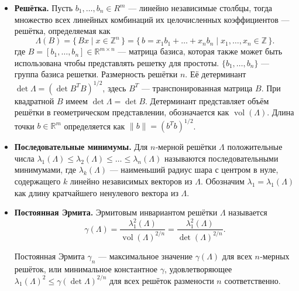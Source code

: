 \begin{itemize}
\item \textbf{Решётка.} Пусть $b_{1},\ldots,b_{n}\in R^{m}$ — линейно
        независимые столбцы, тогда множество всех линейных комбинаций их
        целочисленных коэффициентов — решётка, определяемая как
        \begin{equation} \Lambda(B) =\{\,Bx \mid x\in \mathbb{Z}^{n}\,\} =\{\,b
            = x_{1}b_{1}+\dots+x_{n}b_{n} \mid x_{1},\dots,x_{n}\in
        \mathbb{Z}\,\}. \end{equation}
        где $B=[b_{1},\ldots,b_{n}]\in \mathbb{R}^{m\times n}$ --- матрица
        базиса, которая также может быть использована чтобы представлять
        решетку для простоты. $\{b_1, \ldots, b_n\}$ --- группа базиса решетки.
        Размерность решётки $n$. Её детерминант $\det\Lambda=(\det
        B^{T}B)^{1/2}$, здесь $B^T$ --- транспонированная матрица $B$. При
        квадратной $B$ имеем $\det\Lambda=\det B$. Детерминант представляет
        объём решётки в геометрическом представлении, обозначается как
        $\operatorname{vol}(\Lambda)$. Длина точки $b\in \mathbb{R}^{m}$
        определяется как $\lVert b\rVert=(b^{T}b)^{1/2}$.

\item \textbf{Последовательные минимумы.} Для $n$‑мерной решётки $\Lambda$
        положительные числа $\lambda_{1}(\Lambda)\le\lambda_{2}(\Lambda)
        \le\dots\le\lambda_{n}(\Lambda)$ называются последовательными
        минимумами, где $\lambda_{k}(\Lambda)$ — наименьший радиус шара с
        центром в нуле, содержащего $k$ линейно независимых векторов из
        $\Lambda$. Обозначим $\lambda_{1}=\lambda_{1}(\Lambda)$ как длину
        кратчайшего ненулевого вектора из $\Lambda$.

\item \textbf{Постоянная Эрмита.} Эрмитовым инвариантом решётки $\Lambda$
        называется
        \begin{equation}
          \gamma(\Lambda)
          = \frac{\lambda_{1}^{2}(\Lambda)}{\operatorname{vol}(\Lambda)^{2/n}}
          = \frac{\lambda_{1}^{2}(\Lambda)}{\det(\Lambda)^{2/n}}.
        \end{equation}

        Постоянная Эрмита $\gamma_{n}$ — максимальное значение $\gamma(\Lambda)$
        для всех $n$‑мерных решёток, или минимальное константное $\gamma$,
        удовлетворяющее $\lambda_{1}(\Lambda)^{2}\le\gamma(\det\Lambda)^{2/n}$
        для всех решёток размености $n$ соответственно.


\end{itemize}

